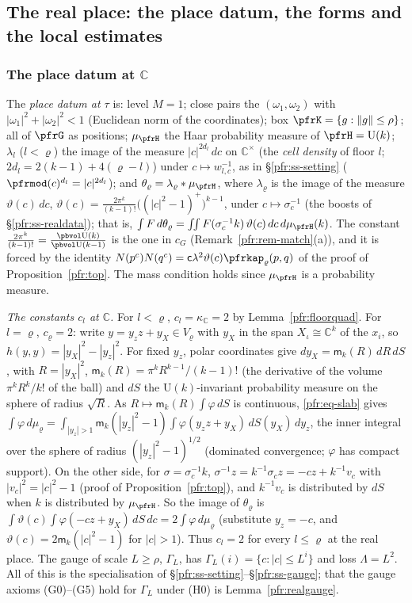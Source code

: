 \documentclass[10pt]{amsart}
\theoremstyle{definition}
\theoremstyle{remark}
\newcommand{\C}{\mathbb C}
\providecommand{\auU}{\mathrm U}
\begin{document}
\subsection{The real place: the place datum, the forms and the local estimates}\label{pfr:ss-realforms}

\subsubsection*{The place datum at $\C$}
The \emph{place datum at $\tau$} is: level $M=1$; close pairs the $(\omega_1,\omega_2)$ with
$|\omega_1|^2+|\omega_2|^2<1$ (Euclidean norm of the coordinates); box $\pfrK=\{g:\|g\|\le\rho\}$; all
of $\pfrG$ as positions; $\mu_\pfrH$ the Haar probability measure of $\pfrH=\auU(k)$; $\lambda_l$ ($l<\varrho$)
the image of the measure $|c|^{2d_l}\,dc$ on $\C^\times$ (the \emph{cell density} of floor $l$;
$2d_l=2(k-1)+4(\varrho-l)$) under $c\mapsto w_{l,c}^{-1}$, as in \S\ref{pfr:ss-setting} ($\pfrmod(c)^{d_l}=|c|^{2d_l}$);
and $\theta_\varrho=\lambda_\varrho*\mu_\pfrH$, where $\lambda_\varrho$ is the image of the measure
$\vartheta(c)\,dc$, $\vartheta(c)=\frac{2\pi^k}{(k-1)!}\bigl((|c|^2-1)^+\bigr)^{k-1}$, under $c\mapsto\sigma_c^{-1}$ (the
boosts of \S\ref{pfr:ss-realdata}); that is, $\int F\,d\theta_\varrho=\iint F(\sigma_c^{-1}k)\,\vartheta(c)\,dc\,d\mu_\pfrH(k)$.
The constant $\frac{2\pi^k}{(k-1)!}=\frac{\pbvol\auU(k)}{\pbvol\auU(k-1)}$ is the one in $c_G$
(Remark~\ref{pfr:rem-match}(a)), and it is forced by the identity $N(p^c)N(q^c)=\mathsf c\lambda^2\vartheta(c)\pfrkap_\varrho(p,q)$
of the proof of Proposition~\ref{pfr:top}. The mass condition holds since $\mu_\pfrH$ is a probability measure.

\emph{The constants $c_l$ at $\C$.} For $l<\varrho$, $c_l=\kappa_\C=2$ by Lemma~\ref{pfr:floorquad}. For $l=\varrho$,
$c_\varrho=2$: write $y=y_zz+y_X\in V_\varrho$ with $y_X$ in the span $X_\iota\cong\C^k$ of the $x_i$, so $h(y,y)=|y_X|^2-|y_z|^2$.
For fixed $y_z$, polar coordinates give $dy_X=\mathsf m_k(R)\,dR\,dS$, with $R=|y_X|^2$,
$\mathsf m_k(R)=\pi^kR^{k-1}/(k-1)!$ (the derivative of the volume $\pi^kR^k/k!$ of the ball) and $dS$ the
$\auU(k)$-invariant probability measure on the sphere of radius $\sqrt R$. As $R\mapsto\mathsf m_k(R)\int\varphi\,dS$ is
continuous, \eqref{pfr:eq-slab} gives $\int\varphi\,d\mu_\varrho=\int_{|y_z|>1}\mathsf m_k(|y_z|^2-1)\int\varphi(y_zz+y_X)\,
dS(y_X)\,dy_z$, the inner integral over the sphere of radius $(|y_z|^2-1)^{1/2}$ (dominated convergence; $\varphi$ has
compact support). On the other side, for $\sigma=\sigma_c^{-1}k$, $\sigma^{-1}z=k^{-1}\sigma_cz=-cz+k^{-1}v_c$ with $|v_c|^2=
|c|^2-1$ (proof of Proposition~\ref{pfr:top}), and $k^{-1}v_c$ is distributed by $dS$ when $k$ is distributed by
$\mu_\pfrH$. So the image of $\theta_\varrho$ is $\int\vartheta(c)\int\varphi(-cz+y_X)\,dS\,dc=2\int\varphi\,d\mu_\varrho$
(substitute $y_z=-c$, and $\vartheta(c)=2\mathsf m_k(|c|^2-1)$ for $|c|>1$). Thus $c_l=2$ for every $l\le\varrho$ at the real place. The gauge of scale
$L\ge\rho$, $\Gamma_L$, has $\Gamma_L(i)=\{c:|c|\le L^i\}$ and loss $\Lambda=L^2$. All of this is the
specialisation of \S\ref{pfr:ss-setting}--\S\ref{pfr:ss-gauge}; that the gauge axioms (G0)--(G5)
hold for $\Gamma_L$ under (H0) is Lemma~\ref{pfr:realgauge}.
\end{document}
